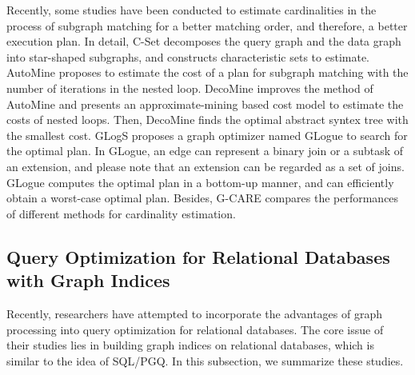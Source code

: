 Recently, some studies have been conducted to estimate cardinalities in the process of subgraph matching for a better matching order, and therefore, a better execution plan.
In detail, 
C-Set \cite{cset} decomposes the query graph and the data graph into star-shaped subgraphs, and constructs characteristic sets to estimate.
AutoMine \cite{AutoMine} proposes to estimate the cost of a plan for subgraph matching with the number of iterations in the nested loop.
DecoMine \cite{DecoMine} improves the method of AutoMine and presents an approximate-mining based cost model to estimate the costs of nested loops.
Then, DecoMine finds the optimal abstract syntex tree with the smallest cost.
GLogS \cite{GLogS} proposes a graph optimizer named GLogue to search for the optimal plan.
In GLogue, an edge can represent a binary join or a subtask of an extension, and please note that an extension can be regarded as a set of joins.
GLogue computes the optimal plan in a bottom-up manner, and can efficiently obtain a worst-case optimal plan.
Besides, G-CARE \cite{gcare} compares the performances of different methods for cardinality estimation.

\subsection{Query Optimization for Relational Databases with Graph Indices}
\label{sec:related-work:ropt-gopt}
Recently, researchers have attempted to incorporate the advantages of graph processing into query optimization for relational databases.
The core issue of their studies lies in building graph indices on relational databases, which is similar to the idea of SQL/PGQ.
In this subsection, we summarize these studies. 



